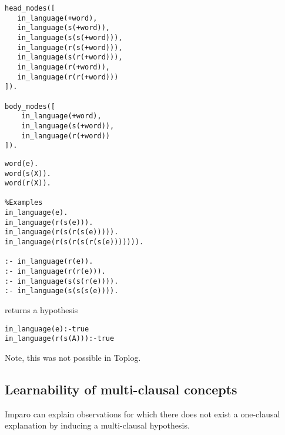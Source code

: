 \begin{minipage}[t]{.50\textwidth}
\begin{lstlisting}
head_modes([
   in_language(+word),
   in_language(s(+word)),  
   in_language(s(s(+word))),
   in_language(r(s(+word))),
   in_language(s(r(+word))),
   in_language(r(+word)),
   in_language(r(r(+word)))
]).

body_modes([
    in_language(+word),
    in_language(s(+word)),
    in_language(r(+word))
]).
\end{lstlisting}
\end{minipage}
\begin{minipage}[t]{.40\textwidth}
\begin{lstlisting}
word(e).
word(s(X)).
word(r(X)).

%Examples
in_language(e).
in_language(r(s(e))).
in_language(r(s(r(s(e))))).
in_language(r(s(r(s(r(s(e))))))).

:- in_language(r(e)).
:- in_language(r(r(e))).
:- in_language(s(s(r(e)))).
:- in_language(s(s(s(e)))).
\end{lstlisting}
\end{minipage}


returns a hypothesis
\begin{lstlisting}
in_language(e):-true
in_language(r(s(A))):-true
\end{lstlisting}

Note, this was not possible in Toplog.

\subsection{Learnability of multi-clausal concepts}
Imparo can explain observations for which there does not exist a one-clausal explanation by inducing a multi-clausal hypothesis.

